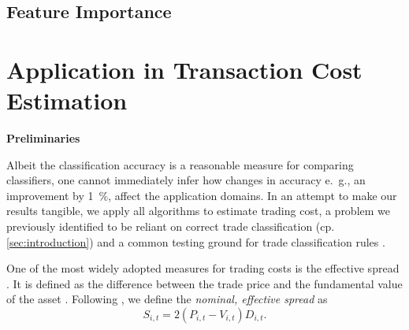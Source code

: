 

\subsection{Feature Importance}\label{sec:feature-importance}

\newpage
\section{Application in Transaction Cost Estimation}\label{sec:application}

\textbf{Preliminaries}


Albeit the classification accuracy is a reasonable measure for comparing classifiers, one cannot immediately infer how changes in accuracy e.~g., an improvement by \SI{1}{\percent}, affect the application domains. In an attempt to make our results tangible, we apply all algorithms to estimate trading cost, a problem we previously identified to be reliant on correct trade classification (cp. \cref{sec:introduction}) and a common testing ground for trade classification rules \autocites[cp.][541]{ellisAccuracyTradeClassification2000}[][569]{finucaneDirectTestMethods2000}[][271--278]{petersonEvaluationBiasesExecution2003}[][896--897]{savickasInferringDirectionOption2003}.

One of the most widely adopted measures for trading costs is the effective spread \autocite[][112]{Piwowar_2006}. It is defined as the difference between the trade price and the fundamental value of the asset \autocite[][238--239]{bessembinderIssuesAssessingTrade2003}. Following \textcite[][238--239]{bessembinderIssuesAssessingTrade2003}, we define the \emph{nominal, effective spread} as
\begin{equation}
    S_{i,t} = 2 (P_{i,t} - V_{i,t}) D_{i,t}.
    \label{eq:effective-spread}
\end{equation}

